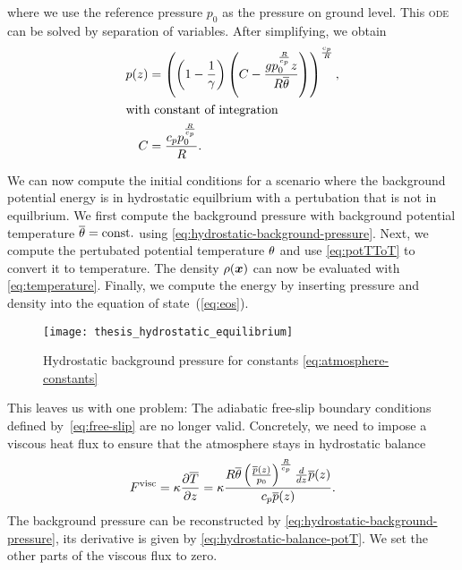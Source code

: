 where we use the reference pressure $p_0$ as the pressure on ground level.
This \textsc{ode} can be solved by separation of variables.
After simplifying, we obtain
\begin{align}
  \label{eq:hydrostatic-background-pressure}
p(z) &= \left(\left(1 - \frac{1}{\gamma}\right) \left(C - \frac{g p_{0}^{\frac{R}{c_{p}}} z}{R \overline{\theta}}\right)\right)^{\frac{c_{p}}{R}},\\
\shortintertext{with constant of integration}
 C &= \frac{c_{p} p_{0}^{\frac{R}{c_{p}}}}{R}.
\end{align}

We can now compute the initial conditions for a scenario where the background potential energy is in hydrostatic equilbrium with a pertubation that is not in equilbrium.
We first compute the background pressure with background potential temperature $\overline{\theta} = \text{const.}$ using \cref{eq:hydrostatic-background-pressure}.
Next, we compute the pertubated potential temperature $\theta$ and use \cref{eq:potTToT} to convert it to temperature.
The density $\rho(\bm{x})$ can now be evaluated with \cref{eq:temperature}.
Finally, we compute the energy by inserting pressure and density into the equation of state~(\ref{eq:eos}).

\begin{figure}[tb]
  \centering
  \texttt{[image: thesis\_hydrostatic\_equilibrium]}
  \caption{\label{fig:hydrostatic-p}%
    Hydrostatic background pressure for constants \cref{eq:atmosphere-constants}}
\end{figure}

This leaves us with one problem:
The adiabatic free-slip boundary conditions defined by~\vref{eq:free-slip} are no longer valid.
Concretely, we need to impose a viscous heat flux to ensure that the atmosphere stays in hydrostatic balance~\cite{giraldo2008study}
\begin{equation}
  \label{eq:atmosphere-bc}
  F^\text{visc} = \kappa \pdv{\overline{T}}{z} =
\kappa \frac{R \overline{\theta} \left(\frac{\overline{p}{\left (z \right )}}{p_{0}}\right)^{\frac{R}{c_{p}}} \frac{d}{d z} \overline{p}{\left (z \right )}}{c_{p} \overline{p}{\left (z \right )}}.
\end{equation}
The background pressure can be reconstructed by \cref{eq:hydrostatic-background-pressure}, its derivative is given by \cref{eq:hydrostatic-balance-potT}.
We set the other parts of the viscous flux to zero.

